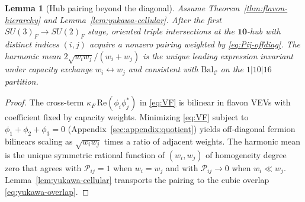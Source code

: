 \documentclass[aps,prd,onecolumn,amsmath,amssymb,nofootinbib,11pt]{revtex4-2}
\numberwithin{equation}{section}
\theoremstyle{plain}
\newtheorem{lemma}[theorem]{Lemma}
\theoremstyle{definition}
\theoremstyle{remark}
\begin{document}
\begin{lemma}[Hub pairing beyond the diagonal]\label{lem:Pij-hub}
Assume Theorem~\ref{thm:flavon-hierarchy} and Lemma~\ref{lem:yukawa-cellular}.
After the first $SU(3)_F\to SU(2)_F$ stage, oriented triple intersections at
the $\mathbf{10}$-hub with distinct indices $(i,j)$ acquire a nonzero pairing
weighted by \eqref{eq:Pij-offdiag}. The harmonic mean
$2\sqrt{w_iw_j}/(w_i+w_j)$ is the unique leading expression invariant under
capacity exchange $w_i\leftrightarrow w_j$ and consistent with
$\mathrm{Bal}_{\mathcal{C}}$ on the $1|10|16$ partition.
\end{lemma}

\begin{proof}
The cross-term $\kappa_F\,\mathrm{Re}(\phi_i\phi_j^*)$ in \eqref{eq:VF} is
bilinear in flavon VEVs with coefficient fixed by capacity weights. Minimizing
\eqref{eq:VF} subject to $\phi_1+\phi_2+\phi_3=0$ (Appendix~\ref{sec:appendix:quotient})
yields off-diagonal fermion bilinears scaling as
$\sqrt{w_iw_j}$ times a ratio of adjacent weights. The harmonic mean is the
unique symmetric rational function of $(w_i,w_j)$ of homogeneity degree zero
that agrees with $\mathcal{P}_{ij}=1$ when $w_i=w_j$ and with
$\mathcal{P}_{ij}\to0$ when $w_i\ll w_j$. Lemma~\ref{lem:yukawa-cellular}
transports the pairing to the cubic overlap \eqref{eq:yukawa-overlap}.
\end{proof}
\end{document}
